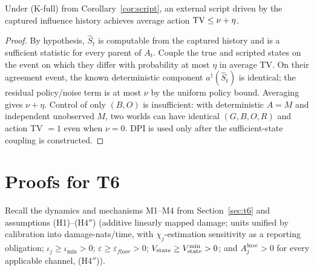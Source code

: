 \begin{corollary}
Under \textup{(K-full)} from Corollary~\ref{cor:script}, an external script
driven by the captured influence history achieves average action
$\mathrm{TV}\le\nu+\eta$.
\end{corollary}
\begin{proof}
By hypothesis, $\hat S_t$ is computable from the captured history and is a
sufficient statistic for every parent of $A_t$. Couple the true and scripted
states on the event on which they differ with probability at most $\eta$ in
average TV. On their agreement event, the known deterministic component
$a^\dagger(\hat S_t)$ is identical; the residual policy/noise term is at most
$\nu$ by the uniform policy bound. Averaging gives $\nu+\eta$. Control of only
$(B,O)$ is insufficient: with deterministic $A=M$ and independent unobserved
$M$, two worlds can have identical $(G,B,O,R)$ and action TV $=1$ even when
$\nu=0$. DPI is used only after the sufficient-state coupling is constructed.
\end{proof}

\section{Proofs for T6}\label{app:t6}

Recall the dynamics and mechanisms M1--M4 from Section~\ref{sec:t6} and
assumptions \textup{(H1)}--\textup{(H4$''$)} (additive linearly mapped damage;
units unified by calibration into damage-nats/time, with $\chi_j$-estimation
sensitivity as a reporting obligation; $\iota_j\ge\iota_{\min}>0$;
$\varepsilon\ge\varepsilon_{floor}>0$; $V_{\mathrm{state}}\ge V_{\mathrm{state}}^{\min}>0$; and
$A_j^{base}>0$ for every applicable channel, \textup{(H4$''$)}).

